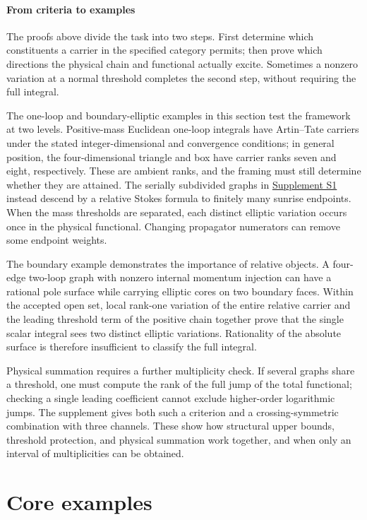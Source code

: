 \documentclass[11pt,a4paper,oneside]{article}
\theoremstyle{plain}
\theoremstyle{definition}
\theoremstyle{remark}
\numberwithin{equation}{section}
\newcommand{\otherref}[2]{\href{#1.pdf}{#2}}
\begin{document}
\endgroup
\subsection{From criteria to examples}
The proofs above divide the task into two steps. First determine which constituents a carrier in the specified category permits; then prove which directions the physical chain and functional actually excite. Sometimes a nonzero variation at a normal threshold completes the second step, without requiring the full integral.

The one-loop and boundary-elliptic examples in this section test the framework at two levels. Positive-mass Euclidean one-loop integrals have Artin--Tate carriers under the stated integer-dimensional and convergence conditions; in general position, the four-dimensional triangle and box have carrier ranks seven and eight, respectively. These are ambient ranks, and the framing must still determine whether they are attained. The serially subdivided graphs in \otherref{feynman_periods_supplement_en}{Supplement S1} instead descend by a relative Stokes formula to finitely many sunrise endpoints. When the mass thresholds are separated, each distinct elliptic variation occurs once in the physical functional. Changing propagator numerators can remove some endpoint weights.

The boundary example demonstrates the importance of relative objects. A four-edge two-loop graph with nonzero internal momentum injection can have a rational pole surface while carrying elliptic cores on two boundary faces. Within the accepted open set, local rank-one variation of the entire relative carrier and the leading threshold term of the positive chain together prove that the single scalar integral sees two distinct elliptic variations. Rationality of the absolute surface is therefore insufficient to classify the full integral.

Physical summation requires a further multiplicity check. If several graphs share a threshold, one must compute the rank of the full jump of the total functional; checking a single leading coefficient cannot exclude higher-order logarithmic jumps. The supplement gives both such a criterion and a crossing-symmetric combination with three channels. These show how structural upper bounds, threshold protection, and physical summation work together, and when only an interval of multiplicities can be obtained.

\part{Core examples}
\end{document}
